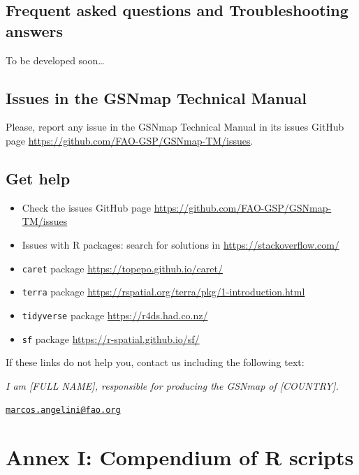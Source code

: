 \documentclass[
  10pt,
  b5paper,
  oneside]{book}
\providecommand{\tightlist}{%
  \setlength{\itemsep}{0pt}\setlength{\parskip}{0pt}}
\begin{document}
\hypertarget{frequent-asked-questions-and-troubleshooting-answers}{%
\section{Frequent asked questions and Troubleshooting answers}\label{frequent-asked-questions-and-troubleshooting-answers}}

To be developed soon\ldots{}

\hypertarget{issues-in-the-gsnmap-technical-manual}{%
\section{Issues in the GSNmap Technical Manual}\label{issues-in-the-gsnmap-technical-manual}}

Please, report any issue in the GSNmap Technical Manual in its issues GitHub page \url{https://github.com/FAO-GSP/GSNmap-TM/issues}.

\hypertarget{get-help}{%
\section{Get help}\label{get-help}}

\begin{itemize}
\tightlist
\item
  Check the issues GitHub page \url{https://github.com/FAO-GSP/GSNmap-TM/issues}
\item
  Issues with R packages: search for solutions in \url{https://stackoverflow.com/}
\item
  \texttt{caret} package \url{https://topepo.github.io/caret/}
\item
  \texttt{terra} package \url{https://rspatial.org/terra/pkg/1-introduction.html}
\item
  \texttt{tidyverse} package \url{https://r4ds.had.co.nz/}
\item
  \texttt{sf} package \url{https://r-spatial.github.io/sf/}
\end{itemize}

If these links do not help you, contact us including the following text:

\emph{I am {[}FULL NAME{]}, responsible for producing the GSNmap of {[}COUNTRY{]}.}

\href{mailto:marcos.angelini@fao.org}{\nolinkurl{marcos.angelini@fao.org}}

\hypertarget{annex-i-compendium-of-r-scripts}{%
\chapter*{Annex I: Compendium of R scripts}\label{annex-i-compendium-of-r-scripts}}
\end{document}

